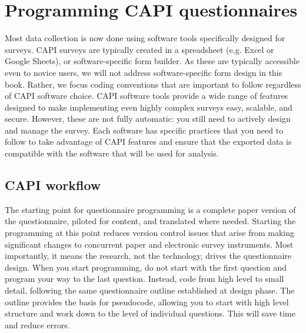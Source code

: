 {\section{Programming CAPI questionnaires}
Most data collection is now done using software tools specifically designed for surveys. CAPI surveys 
are typically created in a spreadsheet (e.g. Excel or Google Sheets), or software-specific form builder. 
As these are typically accessible even to novice users, we will not address software-specific form design in this book. Rather, we focus coding conventions that are important to follow regardless of CAPI software choice. 
 CAPI software tools provide a wide range of features designed to make implementing even highly complex surveys easy, scalable, and secure. However, these are not fully automatic: you still need to actively design and manage the survey. Each software has specific practices that you need to follow to take advantage of CAPI features and ensure that the exported data is compatible with the software that will be used for analysis. 

\subsection{CAPI workflow}
The starting point for questionnaire programming is a complete paper version of the questionnaire, piloted for content, and translated where needed. Starting the programming at this point reduces version control issues that arise from making significant changes to concurrent paper and electronic survey instruments. Most importantly, it means the research, not the technology, drives the questionnaire design. When you start programming, do not start with the first question and program your way to the last question. Instead, code from high level to small detail, following the same questionnaire outline established at design phase. The outline provides the basis for pseudocode, allowing you to start with high level structure and work down to the level of individual questions. This will save time and reduce errors. 

}
